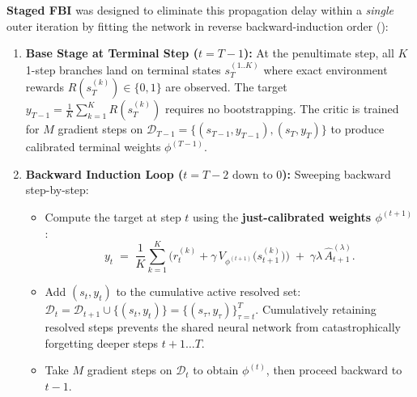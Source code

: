 \documentclass[11pt,a4paper]{article}
\begin{document}
\textbf{Staged FBI} was designed to eliminate this propagation delay within a \emph{single} outer iteration by fitting the network in reverse backward-induction order ():
\begin{enumerate}[leftmargin=*, itemsep=2.5pt]
    \item \textbf{Base Stage at Terminal Step ($t = T-1$):} At the penultimate step, all $K$ 1-step branches land on terminal states $s_T^{(1..K)}$ where exact environment rewards $R(s_T^{(k)}) \in \{0, 1\}$ are observed. The target $y_{T-1} = \frac{1}{K}\sum_{k=1}^K R(s_T^{(k)})$ requires no bootstrapping. The critic is trained for $M$ gradient steps on $\mathcal{D}_{T-1} = \{(s_{T-1}, y_{T-1}), (s_T, y_T)\}$ to produce calibrated terminal weights $\phi^{(T-1)}$.
    \item \textbf{Backward Induction Loop ($t = T-2 \text{ down to } 0$):} Sweeping backward step-by-step:
    \begin{itemize}[itemsep=1.5pt]
        \item Compute the target at step $t$ using the \textbf{just-calibrated weights $\phi^{(t+1)}$}:
        \[
            y_t \;=\; \frac{1}{K}\sum_{k=1}^K \Big( r_t^{(k)} + \gamma \, V_{\phi^{(t+1)}}\big(s_{t+1}^{(k)}\big) \Big) \;+\; \gamma \lambda \, \hat{A}_{t+1}^{(\lambda)}.
        \]
        \item Add $(s_t, y_t)$ to the cumulative active resolved set: $\mathcal{D}_t = \mathcal{D}_{t+1} \cup \{(s_t, y_t)\} = \{(s_\tau, y_\tau)\}_{\tau=t}^T$. Cumulatively retaining resolved steps prevents the shared neural network from catastrophically forgetting deeper steps $t+1 \dots T$.
        \item Take $M$ gradient steps on $\mathcal{D}_t$ to obtain $\phi^{(t)}$, then proceed backward to $t-1$.
    \end{itemize}
\end{enumerate}
\end{document}
